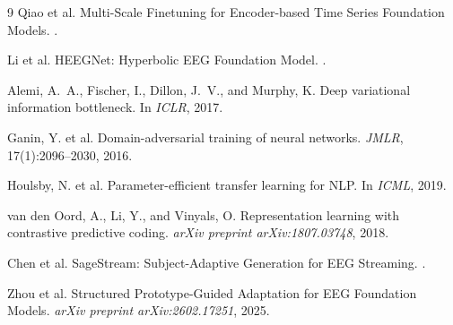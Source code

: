 \documentclass{article}
\begin{document}
\begin{thebibliography}{9}
Qiao et al.
\newblock Multi-Scale Finetuning for Encoder-based Time Series Foundation Models.
.

Li et al.
\newblock HEEGNet: Hyperbolic EEG Foundation Model.
.

Alemi, A.~A., Fischer, I., Dillon, J.~V., and Murphy, K.
\newblock Deep variational information bottleneck.
\newblock In \emph{ICLR}, 2017.

Ganin, Y. et al.
\newblock Domain-adversarial training of neural networks.
\newblock \emph{JMLR}, 17(1):2096--2030, 2016.

Houlsby, N. et al.
\newblock Parameter-efficient transfer learning for NLP.
\newblock In \emph{ICML}, 2019.

van den Oord, A., Li, Y., and Vinyals, O.
\newblock Representation learning with contrastive predictive coding.
\newblock \emph{arXiv preprint arXiv:1807.03748}, 2018.

Chen et al.
\newblock SageStream: Subject-Adaptive Generation for EEG Streaming.
.

Zhou et al.
\newblock Structured Prototype-Guided Adaptation for EEG Foundation Models.
\newblock \emph{arXiv preprint arXiv:2602.17251}, 2025.
\end{thebibliography}
\end{document}
